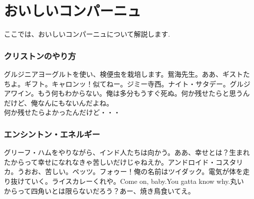 \documentclass[fleqn,leqno,autodetect-engine,dvipdfmxi-if-dvi,ja=standard]{bxjsarticle}
\begin{document}
\part{おいしいコンパーニュ}
ここでは、おいしいコンパーニュについて解説します.

\section{クリストンのやり方}
グルジニアヨーグルトを使い、検便虫を栽培します。鴛海先生。ああ、ギストたちよ。ギフト。キャロンッ！似てねー。ジミー寺西。ナイト・サタデー。グルジアワイン。もう何もわからない。俺は多分もうすぐ死ぬ。何か残せたらと思うんだけど、俺なんにもないんだよね。\\

何か残せたらよかったんだけど・・・

\section{エンシントン・エネルギー}
グリーフ・ハムをやりながら、インド人たちは向かう。ああ、幸せとは？生まれたからって幸せになれなきゃ苦しいだけじゃねえか。アンドロイド・コスタリカ。うおお、苦しい。ペッツ。フォゥー！俺の名前はツイダック。電気が体を走り抜けていく。ライスカレーくれや。Come on, baby.You gatta know why.丸いからって四角いとは限らないだろう？あー、焼き鳥食いてえ。
\end{document}

